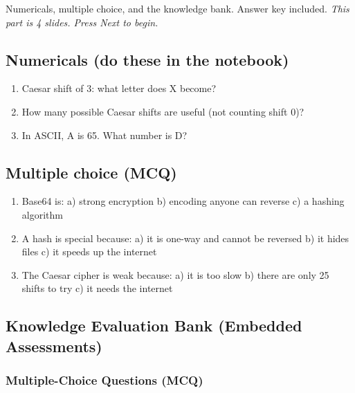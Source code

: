 \documentclass[12pt,openany]{book}
\begin{document}
Numericals, multiple choice, and the knowledge bank. Answer key included.
{\small\itshape\color{gray}This part is 4 slides. Press Next to begin.}

\medskip

\subsection*{Numericals (do these in the notebook)}


\begin{enumerate}

  \item Caesar shift of 3: what letter does X become?

  \item How many possible Caesar shifts are useful (not counting shift 0)?

  \item In ASCII, A is 65. What number is D?

\end{enumerate}

\medskip

\subsection*{Multiple choice (MCQ)}


\begin{enumerate}

  \item Base64 is:
   a) strong encryption  b) encoding anyone can reverse  c) a hashing algorithm

  \item A hash is special because:
   a) it is one-way and cannot be reversed  b) it hides files  c) it speeds up the internet

  \item The Caesar cipher is weak because:
   a) it is too slow  b) there are only 25 shifts to try  c) it needs the internet

\end{enumerate}

\medskip

\subsection*{Knowledge Evaluation Bank (Embedded Assessments)}


\subsubsection*{Multiple-Choice Questions (MCQ)}
\end{document}
